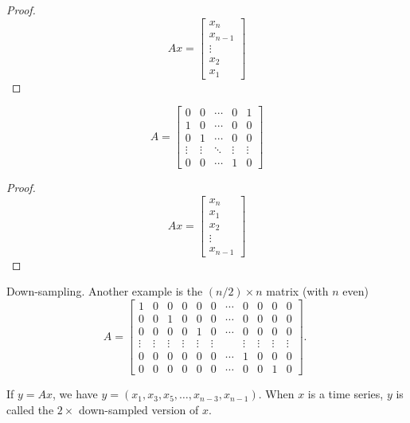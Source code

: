 \begin{proof}
    $$ A x=\left[\begin{array}{c}x_{n} \\ x_{n-1} \\ \vdots \\ x_{2} \\ x_{1}\end{array}\right] $$
\end{proof}

\begin{definition}
    $$ A=\left[\begin{array}{ccccc}0 & 0 & \cdots & 0 & 1 \\ 1 & 0 & \cdots & 0 & 0 \\ 0 & 1 & \cdots & 0 & 0 \\ \vdots & \vdots & \ddots & \vdots & \vdots \\ 0 & 0 & \cdots & 1 & 0\end{array}\right] $$
\end{definition}

\begin{proof}
    $$ A x=\left[\begin{array}{c}x_{n} \\ x_{1} \\ x_{2} \\ \vdots \\ x_{n-1}\end{array}\right] $$
\end{proof}

\begin{definition}[Downsampling]
    Down-sampling. Another example is the $ (n / 2) \times n $ matrix (with $ n $ even)
$$
A=\left[\begin{array}{ccccccccccc}
1 & 0 & 0 & 0 & 0 & 0 & \cdots & 0 & 0 & 0 & 0 \\
0 & 0 & 1 & 0 & 0 & 0 & \cdots & 0 & 0 & 0 & 0 \\
0 & 0 & 0 & 0 & 1 & 0 & \cdots & 0 & 0 & 0 & 0 \\
\vdots & \vdots & \vdots & \vdots & \vdots & \vdots & & \vdots & \vdots & \vdots & \vdots \\
0 & 0 & 0 & 0 & 0 & 0 & \cdots & 1 & 0 & 0 & 0 \\
0 & 0 & 0 & 0 & 0 & 0 & \cdots & 0 & 0 & 1 & 0
\end{array}\right] \text {. }
$$
\end{definition}

\begin{example}
    If $ y=A x $, we have $ y=\left(x_{1}, x_{3}, x_{5}, \ldots, x_{n-3}, x_{n-1}\right) $. When $ x $ is a time series, $ y $ is called the $ 2 \times $ down-sampled version of $ x $.
\end{example}

